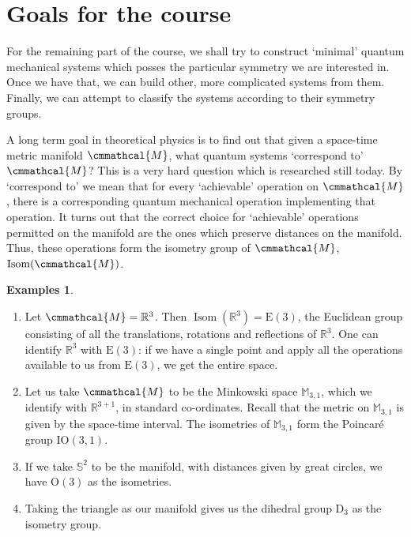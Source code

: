 \documentclass[a4 paper, 12pt]{book}
\renewcommand{\mathcal}{\cmmathcal}
\theoremstyle{definition}
\newtheorem{examples}[theorem]{Examples}
\newcommand{\rr}{\mathbb{R}}
\renewcommand{\ss}{\mathbb{S}}
\newcommand{\mm}{\mathbb{M}}
\newcommand{\ortho}{\mathrm{O}}
\newcommand{\man}{\mathcal{M}}
\newcommand{\euc}{\mathrm{E}}
\DeclareMathOperator{\isom}{Isom}
\newcommand{\mink}{\mm_{3,1}}
\newcommand{\poin}{\mathrm{IO}(3,1)}
\begin{document}
	\section{Goals for the course}

	For the remaining part of the course, we shall try to construct `minimal' quantum mechanical systems which posses the particular symmetry we are interested in. Once we have that, we can build other, more complicated systems from them. Finally, we can attempt to classify the systems according to their symmetry groups.

	A long term goal in theoretical physics is to find out that given a space-time metric manifold \(\man\), what quantum systems `correspond to' \(\man\)? This is a very hard question which is researched still today. By `correspond to' we mean that for every `achievable' operation on \(\man\), there is a corresponding quantum mechanical operation implementing that operation. It turns out that the correct choice for `achievable' operations permitted on the manifold are the ones which preserve distances on the manifold. Thus, these operations form the isometry group of \(\man\), \(\isom(\man)\).
	\begin{examples}
		\leavevmode \vspace{-\baselineskip}\vspace{12pt}
		\begin{enumerate}
		    \item Let \(\man = \rr^3\). Then \(\isom(\rr^3) = \euc(3)\), the Euclidean group consisting of all the translations, rotations and reflections of \(\rr^3\). One can identify \(\rr^3\) with \(\euc(3)\): if we have a single point and apply all the operations available to us from \(\euc(3)\), we get the entire space.
			\item Let us take \(\man\) to be the Minkowski space \(\mink\), which we identify with \(\rr^{3+1}\), in standard co-ordinates. Recall that the metric on \(\mink\) is given by the space-time interval. The isometries of \(\mink\) form the Poincaré group \(\poin\).
			\item If we take \(\ss^2\) to be the manifold, with distances given by great circles, we have \(\ortho(3)\) as the isometries.
			\item Taking the triangle as our manifold gives us the dihedral group \(\mathrm{D}_3\) as the isometry group.
		\end{enumerate}
	\end{examples}

	\nocite{*}
	\printbibliography[heading=bibintoc]
	\printindex
\end{document}
